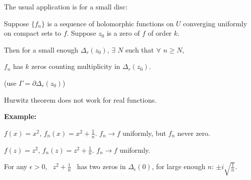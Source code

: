 \documentclass[10pt,aspectratio=169]{beamer}
\begin{document}
\begin{frame}
The usual application is for a small disc:

\medskip
\pause

Suppose $\{ f_n \}$ is a sequence of holomorphic
functions on $U$ converging uniformly
on compact sets to $f$.
\pause
Suppose $z_0$ is a zero of
$f$ of order $k$.

\medskip
\pause
Then for a small enough $\Delta_r(z_0)$,
$\exists$ $N$ such that
$\forall$ $n \geq N$,

$f_n$ has $k$ zeros counting multiplicity in
$\Delta_r(z_0)$.

(use $\Gamma = \partial \Delta_r(z_0)$)

\bigskip
\pause

Hurwitz theorem does not work for real functions.

\medskip
\pause

\textbf{Example:}

$f(x) = x^2$, \quad $f_n(x) = x^2+\frac{1}{n}$.  \quad $f_n \to f$ uniformly, but
$f_n$ never zero.

\medskip
\pause

$f(z) = z^2$, \quad $f_n(z) = z^2+\frac{1}{n}$.  \quad $f_n \to f$ uniformly.

\pause
\medskip

For any $\epsilon > 0$, ~$z^2+\frac{1}{n}$~ has
two zeros in $\Delta_\epsilon(0)$, for large enough $n$:
\quad
$\pm i \sqrt{\frac{1}{n}}$.
\end{frame}
\end{document}
